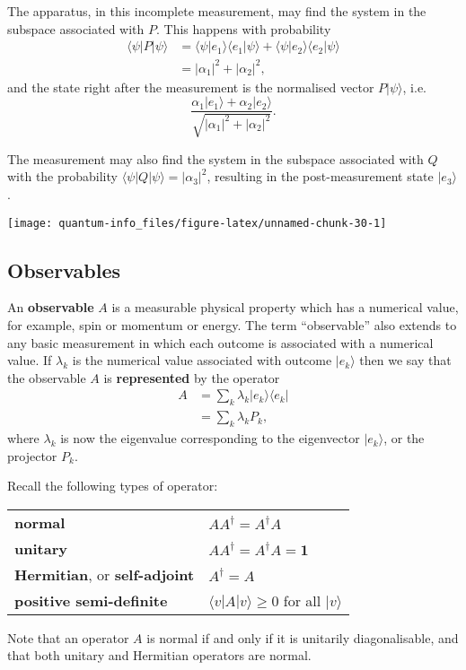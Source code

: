 \documentclass[fleqn]{article}
\newenvironment{idea}{\noindent}{\medskip}
\begin{document}
The apparatus, in this incomplete measurement, may find the system in the subspace associated with \(P\).
This happens with probability
\[
  \begin{aligned}
    \langle\psi|P|\psi\rangle
    &= \langle\psi|e_1\rangle \langle e_1|\psi\rangle + \langle\psi|e_2\rangle \langle e_2|\psi\rangle
  \\&= |\alpha_1|^2 + |\alpha_2|^2,
  \end{aligned}
\]
and the state right after the measurement is the normalised vector \(P|\psi\rangle\), i.e.
\[
  \frac{\alpha_1|e_1\rangle+\alpha_2|e_2\rangle}{\sqrt{|\alpha_1|^2 + |\alpha_2|^2}}.
\]

The measurement may also find the system in the subspace associated with \(Q\) with the probability \(\langle\psi|Q|\psi\rangle = |\alpha_3|^2\), resulting in the post-measurement state \(|e_3\rangle\).

\begin{center}\texttt{[image: quantum-info\_files/figure-latex/unnamed-chunk-30-1]} \end{center}

\hypertarget{observables}{%
\subsection{Observables}\label{observables}}

An \textbf{observable} \(A\) is a measurable physical property which has a numerical value, for example, spin or momentum or energy.
The term ``observable'' also extends to any basic measurement in which each outcome is associated with a numerical value.
If \(\lambda_k\) is the numerical value associated with outcome \(|e_k\rangle\) then we say that the observable \(A\) is \textbf{represented} by the operator
\[
  \begin{aligned}
    A
    &= \sum_k \lambda_k |e_k\rangle\langle e_k|
  \\&= \sum_k \lambda_k P_k,
  \end{aligned}
\]
where \(\lambda_k\) is now the eigenvalue corresponding to the eigenvector \(|e_k\rangle\), or the projector \(P_k\).

\begin{idea}

Recall the following types of operator:

\begin{longtable}[]{@{}ll@{}}
\toprule
\endhead
\textbf{normal} & \(AA^\dagger = A^\dagger A\)\tabularnewline
\textbf{unitary} & \(AA^\dagger = A^\dagger A = \mathbf{1}\)\tabularnewline
\textbf{Hermitian}, or \textbf{self-adjoint} & \(A^\dagger = A\)\tabularnewline
\textbf{positive semi-definite} & \(\langle v|A|v\rangle\geqslant 0\) for all \(|v\rangle\)\tabularnewline
\bottomrule
\end{longtable}

Note that an operator \(A\) is normal if and only if it is unitarily diagonalisable, and that both unitary and Hermitian operators are normal.

\end{idea}
\end{document}
